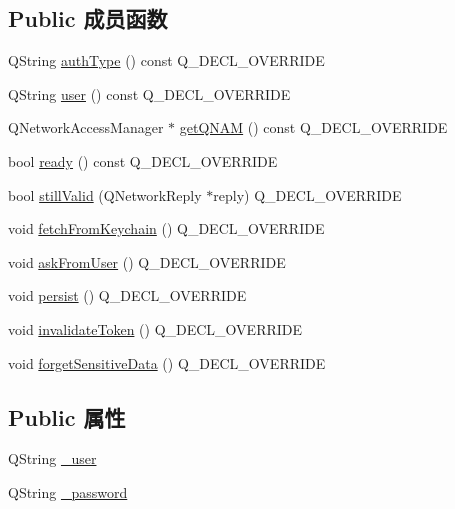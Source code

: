 \subsection*{Public 成员函数}
\begin{DoxyCompactItemize}
\item 
Q\+String \hyperlink{class_o_c_c_1_1_dummy_credentials_af712b0e77040f513ab91771cdc167f16}{auth\+Type} () const Q\+\_\+\+D\+E\+C\+L\+\_\+\+O\+V\+E\+R\+R\+I\+DE
\item 
Q\+String \hyperlink{class_o_c_c_1_1_dummy_credentials_a98ae82a333546d10928308dd31b78cf6}{user} () const Q\+\_\+\+D\+E\+C\+L\+\_\+\+O\+V\+E\+R\+R\+I\+DE
\item 
Q\+Network\+Access\+Manager $\ast$ \hyperlink{class_o_c_c_1_1_dummy_credentials_af8987175306059ae7beaff9e38b5c68d}{get\+Q\+N\+AM} () const Q\+\_\+\+D\+E\+C\+L\+\_\+\+O\+V\+E\+R\+R\+I\+DE
\item 
bool \hyperlink{class_o_c_c_1_1_dummy_credentials_a2702abfdea4b6d5158867fd66951fc3a}{ready} () const Q\+\_\+\+D\+E\+C\+L\+\_\+\+O\+V\+E\+R\+R\+I\+DE
\item 
bool \hyperlink{class_o_c_c_1_1_dummy_credentials_ad5076e854fcbf690689da685002a01a0}{still\+Valid} (Q\+Network\+Reply $\ast$reply) Q\+\_\+\+D\+E\+C\+L\+\_\+\+O\+V\+E\+R\+R\+I\+DE
\item 
void \hyperlink{class_o_c_c_1_1_dummy_credentials_a4b73e13551260fbd397fc300c833c5cc}{fetch\+From\+Keychain} () Q\+\_\+\+D\+E\+C\+L\+\_\+\+O\+V\+E\+R\+R\+I\+DE
\item 
void \hyperlink{class_o_c_c_1_1_dummy_credentials_aa75b74ddf9cbabb2d1fe95b7e641b2aa}{ask\+From\+User} () Q\+\_\+\+D\+E\+C\+L\+\_\+\+O\+V\+E\+R\+R\+I\+DE
\item 
void \hyperlink{class_o_c_c_1_1_dummy_credentials_a6a0144c1c4d2db8ac9314d3c202ca643}{persist} () Q\+\_\+\+D\+E\+C\+L\+\_\+\+O\+V\+E\+R\+R\+I\+DE
\item 
void \hyperlink{class_o_c_c_1_1_dummy_credentials_a57c8037130e3c0b1729d7d89390a599b}{invalidate\+Token} () Q\+\_\+\+D\+E\+C\+L\+\_\+\+O\+V\+E\+R\+R\+I\+DE
\item 
void \hyperlink{class_o_c_c_1_1_dummy_credentials_abbe85cf8654a6828a8a86639c40b1d72}{forget\+Sensitive\+Data} () Q\+\_\+\+D\+E\+C\+L\+\_\+\+O\+V\+E\+R\+R\+I\+DE
\end{DoxyCompactItemize}
\subsection*{Public 属性}
\begin{DoxyCompactItemize}
\item 
Q\+String \hyperlink{class_o_c_c_1_1_dummy_credentials_a9bd3d96ad6b7cad930196cf2c5d046e2}{\+\_\+user}
\item 
Q\+String \hyperlink{class_o_c_c_1_1_dummy_credentials_a3fbd6fa98b3fd08b83bbce9059aa02f1}{\+\_\+password}
\end{DoxyCompactItemize}

